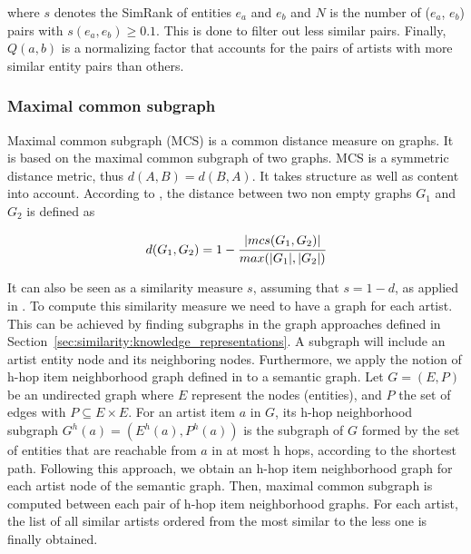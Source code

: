 where $s$ denotes the SimRank of entities $e_a$ and $e_b$ and $N$ is the number of ($e_a$, $e_b$) pairs with $s(e_a, e_b) \geq 0.1$. This is done to filter out less similar pairs.
%
Finally, $Q(a,b)$ is a normalizing factor that accounts for the pairs of artists with more similar entity pairs than others.

%


\subsubsection{Maximal common subgraph}\label{sec:similarity:method:sim:mcs} %

Maximal common subgraph (MCS) is a common distance measure on graphs. It is based on the maximal common subgraph of two graphs. MCS is a symmetric distance metric, thus $d(A,B)=d(B,A)$. It takes structure as well as content into account. According to \cite{Bunke1998}, the distance between two non empty graphs $G_{1}$ and $G_{2}$ is defined as

\begin{equation}
d(G_{1},G_{2}) = 1 - \cfrac{| mcs(G_{1},G_{2}) |}{max(|G_{1}|,|G_{2}|)}
\end{equation}

It can also be seen as a similarity measure $s$, assuming that $s=1-d$, as applied in \cite{Lux2005}. To compute this similarity measure we need to have a graph for each artist. This can be achieved by finding subgraphs in the graph approaches defined in Section~\ref{sec:similarity:knowledge_representations}. A subgraph will include an artist entity node and its neighboring nodes.
Furthermore, we apply the notion of h-hop item neighborhood graph defined in \cite{ODMD14a} to a semantic graph. Let $G=(E,P)$ be an undirected graph where $E$ represent the nodes (entities), and $P$ the set of edges with $P \subseteq E \times E$. For an artist item $a$ in $G$, its h-hop neighborhood subgraph $G^{h}(a)=(E^{h}(a),P^{h}(a))$ is the subgraph of $G$ formed by the set of entities that are reachable from $a$ in at most h hops, according to the shortest path. %
Following this approach, we obtain an h-hop item neighborhood graph for each artist node of the semantic graph. Then, maximal common subgraph is computed between each pair of h-hop item neighborhood graphs. For each artist, the list of all similar artists ordered from the most similar to the less one is finally obtained.

